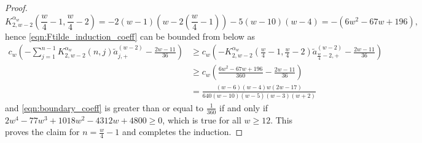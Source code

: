 \documentclass[10pt,a4paper]{amsart}
\begin{document}
\begin{proof}
    \[
    K_{2,w-2}^{\alpha_w}\left(\frac{w}{4}-1, \frac{w}{4}-2\right) = -2(w-1)\left(w - 2\left(\frac{w}{4}-1\right)\right) - 5(w-10)(w-4) = -(6w^2 - 67w + 196),
    \]
    hence \eqref{eqn:Ftilde_induction_coeff} can be bounded from below as
    \begin{align}
        c_w\left(-\sum_{j=1}^{n-1} K_{2,w-2}^{\alpha_w}(n,j)\tilde{a}_{j,+}^{(w-2)} - \frac{2w-11}{36}\right) &\ge c_w \left(-K_{2,w-2}^{\alpha_w}\left(\frac{w}{4}-1, \frac{w}{4}-2\right) \tilde{a}_{\frac{w}{4}-2,+}^{(w-2)} - \frac{2w-11}{36}\right) \nonumber \\
        &\ge c_w \left(\frac{6w^2 - 67w + 196}{360} - \frac{2w - 11}{36}\right) \nonumber \\
        &= \frac{(w-6)(w-4)w(2w-17)}{640(w-10)(w-5)(w-3)(w+2)} \label{eqn:boundary_coeff}
    \end{align}
    and \eqref{eqn:boundary_coeff} is greater than or equal to $\frac{1}{360}$ if and only if $2w^4 - 77w^3 + 1018 w^2 - 4312 w + 4800 \ge 0$, which is true for all $w \ge 12$.
    This proves the claim for $n = \frac{w}{4} - 1$ and completes the induction.
\end{proof}
\end{document}

